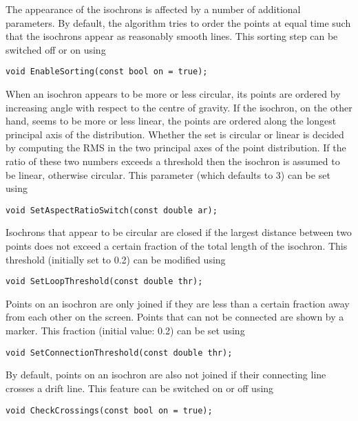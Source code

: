 The appearance of the isochrons is affected by a number of additional parameters.
By default, the algorithm tries to order the points at equal time such that 
the isochrons appear as reasonably smooth lines. 
This sorting step can be switched off or on using
\begin{lstlisting}
void EnableSorting(const bool on = true);
\end{lstlisting} 
When an isochron appears to be more or less circular, its points 
are ordered by increasing angle with respect to the centre of gravity. 
If the isochron, on the other hand, seems to be more or less linear, 
the points are ordered along the longest principal axis of the distribution.
Whether the set is circular or linear is decided by computing the RMS 
in the two principal axes of the point distribution. 
If the ratio of these two numbers exceeds a threshold
then the isochron is assumed to be linear, otherwise circular.
This parameter (which defaults to 3) can be set using
\begin{lstlisting}
void SetAspectRatioSwitch(const double ar);
\end{lstlisting}
Isochrons that appear to be circular are closed if the largest distance 
between two points does not exceed a certain fraction of the 
total length of the isochron. 
This threshold (initially set to 0.2) can be modified using
\begin{lstlisting}
void SetLoopThreshold(const double thr);
\end{lstlisting}

Points on an isochron are only joined if they are less than a 
certain fraction away from each other on the screen. 
Points that can not be connected are shown by a marker. 
This fraction (initial value: 0.2) can be set using
\begin{lstlisting}
void SetConnectionThreshold(const double thr);
\end{lstlisting}
By default, points on an isochron are also not joined if their connecting 
line crosses a drift line.
This feature can be switched on or off using
\begin{lstlisting}
void CheckCrossings(const bool on = true);
\end{lstlisting}


